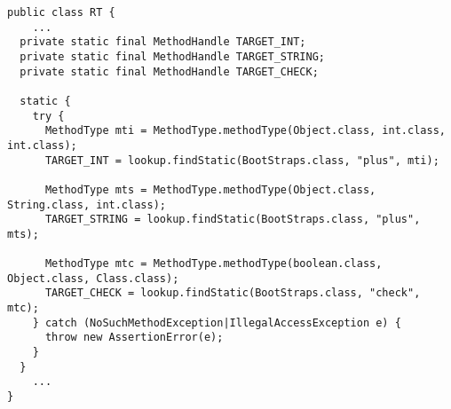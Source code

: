 {\tiny \begin{verbatim}
public class RT {
    ...
  private static final MethodHandle TARGET_INT;
  private static final MethodHandle TARGET_STRING;
  private static final MethodHandle TARGET_CHECK;

  static {
    try {
      MethodType mti = MethodType.methodType(Object.class, int.class, int.class);
      TARGET_INT = lookup.findStatic(BootStraps.class, "plus", mti);

      MethodType mts = MethodType.methodType(Object.class, String.class, int.class);
      TARGET_STRING = lookup.findStatic(BootStraps.class, "plus", mts);

      MethodType mtc = MethodType.methodType(boolean.class, Object.class, Class.class);
      TARGET_CHECK = lookup.findStatic(BootStraps.class, "check", mtc);
    } catch (NoSuchMethodException|IllegalAccessException e) {
      throw new AssertionError(e);
    }
  }
    ...
}
\end{verbatim} }
